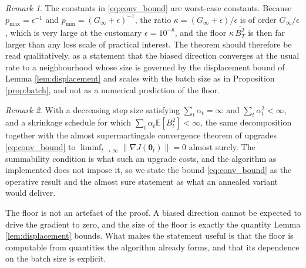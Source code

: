 \documentclass[a4paper,fleqn]{cas-dc}
\theoremstyle{plain}
\theoremstyle{definition}
\theoremstyle{remark}
\newtheorem{remark}{Remark}
\newenvironment{revblock}{}{}
\newcommand{\E}{\mathbb{E}}
\begin{document}
\begin{remark}
\label{rem:constants}
The constants in \eqref{eq:conv_bound} are worst-case constants. Because $p_{\max}=\epsilon^{-1}$ and $p_{\min}=(G_\infty+\epsilon)^{-1}$, the ratio $\kappa=(G_\infty+\epsilon)/\epsilon$ is of order $G_\infty/\epsilon$, which is very large at the customary $\epsilon=10^{-8}$, and the floor $\kappa\,\overline{B^2_T}$ is then far larger than any loss scale of practical interest. The theorem should therefore be read qualitatively, as a statement that the biased direction converges at the usual rate to a neighbourhood whose size is governed by the displacement bound of Lemma \ref{lem:displacement} and scales with the batch size as in Proposition \ref{prop:batch}, and not as a numerical prediction of the floor.
\end{remark}

\begin{remark}
With a decreasing step size satisfying $\sum_t\alpha_t=\infty$ and $\sum_t\alpha^2_t<\infty$, and a shrinkage schedule for which $\sum_t\alpha_t\E[B^2_t]<\infty$, the same decomposition together with the almost supermartingale convergence theorem of \citet{robbins1971} upgrades \eqref{eq:conv_bound} to $\liminf_{t\to\infty}\|\nabla J(\bm\theta_t)\|=0$ almost surely. The summability condition is what such an upgrade costs, and the algorithm as implemented does not impose it, so we state the bound \eqref{eq:conv_bound} as the operative result and the almost sure statement as what an annealed variant would deliver.
\end{remark}

The floor is not an artefact of the proof. A biased direction cannot be expected to drive the gradient to zero, and the size of the floor is exactly the quantity Lemma \ref{lem:displacement} bounds. What makes the statement useful is that the floor is computable from quantities the algorithm already forms, and that its dependence on the batch size is explicit.
\end{document}
